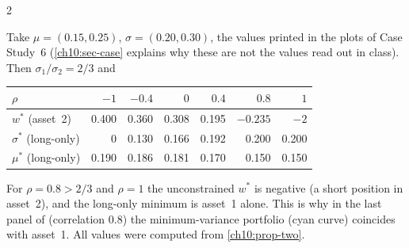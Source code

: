 \begin{paracol}{2}
\begin{example}\label{ch10:ex-two}
Take $\mu=(0.15,0.25)$, $\sigma=(0.20,0.30)$, the values printed in the plots of Case Study~6
(\cref{ch10:sec-case} explains why these are not the values read out in class). Then $\sigma_1/\sigma_2=2/3$ and
\begin{center}
\begin{tabular}{@{}lrrrrrr@{}}
\toprule
$\rho$ & $-1$ & $-0.4$ & $0$ & $0.4$ & $0.8$ & $1$\\
\midrule
$w^*$ (asset~2) & 0.400 & 0.360 & 0.308 & 0.195 & $-0.235$ & $-2$\\
$\sigma^*$ (long-only) & 0 & 0.130 & 0.166 & 0.192 & 0.200 & 0.200\\
$\mu^*$ (long-only) & 0.190 & 0.186 & 0.181 & 0.170 & 0.150 & 0.150\\
\bottomrule
\end{tabular}
\end{center}
For $\rho=0.8>2/3$ and $\rho=1$ the unconstrained $w^*$ is negative (a short position in asset~2), and the
long-only minimum is asset~1 alone. This is why in the last panel of  (correlation $0.8$) the
minimum-variance portfolio (cyan curve) coincides with asset~1. All values were computed from
\cref{ch10:prop-two}.
\end{example}


\end{paracol}
